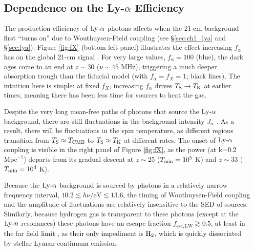\subsection{Dependence on the Ly-$\alpha$ Efficiency} \label{sec:dep_alpha}
The production efficiency of $\text{Ly-}\alpha$ photons affects when the 21-cm background first ``turns on'' due to Wouthuysen-Field coupling (see \S\ref{sec:ch1_lya} and \S\ref{sec:lya}). Figure \ref{fig:fX} (bottom left panel) illustrates the effect increasing $f_{\alpha}$ has on the global 21-cm signal \cite{Pritchard2010}. For very large values, $f_{\alpha} = 100$ (blue), the dark ages come to an end at $z \sim 30$ ($\nu \sim 45$ MHz), triggering a much deeper absorption trough than the fiducial model (with $f_{\alpha} = f_X = 1$; black lines). The intuition here is simple: at fixed $f_X$, increasing $f_{\alpha}$ drives $T_{\text{S}} \rightarrow T_{\text{K}}$ at earlier times, meaning there has been less time for sources to heat the gas. 

Despite the very long mean-free paths of photons that source the $\text{Ly-}\alpha$ background, there are still fluctuations in the background intensity $J_{\alpha}$ \cite{Barkana2005,Ahn2009,Holzbauer2012}. As a result, there will be fluctuations in the spin temperature, as different regions transition from $T_{\text{S}} \approx T_{\text{CMB}}$ to $T_{\text{S}} \approx T_{\text{K}}$ at different rates. The onset of $\text{Ly-}\alpha$ coupling is visible in the right panel of Figure \ref{fig:fX}, as the power (at k=0.2 $\mathrm{Mpc}^{-1}$) departs from its gradual descent at $z \sim 25$ ($T_{\min} = 10^{5}$ K) and $z \sim 33$ ($T_{\min} = 10^4$ K).

Because the $\text{Ly-}\alpha$ background is sourced by photons in a relatively narrow frequency interval, $10.2 \lesssim h \nu / \mathrm{eV} \lesssim 13.6$, the timing of Wouthuysen-Field coupling and the amplitude of fluctuations are relatively insensitive to the SED of sources. Similarly, because hydrogen gas is transparent to these photons (except at the $\text{Ly-}n$ resonances) these photons have an escape fraction $f_{\mathrm{esc,LW}} \gtrsim 0.5$, at least in the far field limit \cite{Schauer2015}, as their only impediment is $\text{H}_2$, which is quickly dissociated by stellar Lyman-continuum emission.

